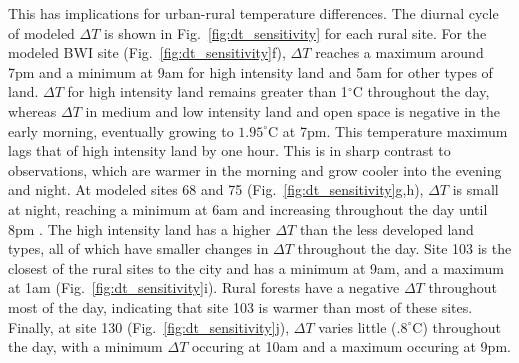 \documentclass[draft,linenumbers]{agujournal}
\begin{document}
 This has implications for urban-rural temperature differences. The diurnal cycle of modeled $\Delta T$ is shown in Fig.~\ref{fig:dt_sensitivity} for each rural site. 
 For the modeled BWI site (Fig.~\ref{fig:dt_sensitivity}f), $\Delta T$ reaches a maximum around 7pm and a minimum at 9am for high intensity land and 5am for other types of land. $\Delta T$ for high intensity land remains greater than 1$^\circ$C throughout the day, whereas $\Delta T$ in medium and low intensity land and open space is negative in the early morning, eventually growing to $1.95^\circ$C at 7pm. This temperature maximum lags that of high intensity land by one hour. This is in sharp contrast to observations, which are warmer in the morning and grow cooler into the evening and night. 
 At modeled sites 68 and 75 (Fig.~\ref{fig:dt_sensitivity}g,h), $\Delta T$ is small at night, reaching a minimum at 6am and increasing throughout the day until 8pm . The high intensity land has a higher $\Delta T$ than the less developed land types, all of which have smaller changes in $\Delta T$ throughout the day. 
Site 103 is the closest of the rural sites to the city  and has a minimum at 9am, and a maximum at 1am (Fig.~\ref{fig:dt_sensitivity}i). 
Rural forests have a negative $\Delta T$ throughout most of the day, indicating that site 103 is warmer than most of these sites. 
Finally, at site 130 (Fig.~\ref{fig:dt_sensitivity}j), $\Delta T$ varies little ($.8^\circ $C) throughout the day, with a minimum $\Delta T$ occuring at 10am and a maximum occuring at 9pm. 
\end{document}
